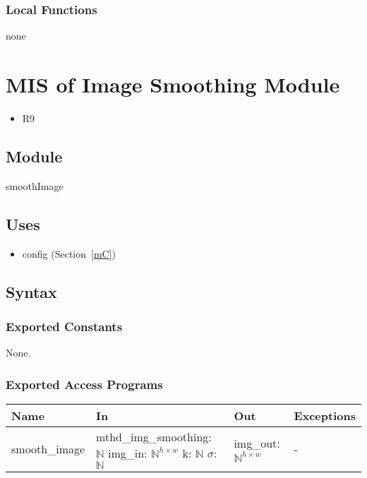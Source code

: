 \documentclass[12pt, titlepage]{article}
\begin{document}
\subsubsection{Local Functions}
none


\section{MIS of Image Smoothing Module} \label{mIS}
\begin{itemize}
  \item R9
\end{itemize}
\subsection{Module}
smoothImage

\subsection{Uses}
\begin{itemize}
  \item config (Section~\ref{mC})
\end{itemize}

\subsection{Syntax}
\subsubsection{Exported Constants}
None.
\subsubsection{Exported Access Programs}
\begin{center}
  \begin{tabular}{p{4cm} p{4.5cm} p{4cm} p{2cm}}
  \hline
  \textbf{Name} & \textbf{In} & \textbf{Out} & \textbf{Exceptions} \\
  \hline
  smooth\_image
  & mthd\_img\_smoothing: $\mathbb{N}$ \newline
  img\_in: $\mathbb{N}^{h \times w}$ \newline
  k: $\mathbb{N}$ \newline
  $\sigma$: $\mathbb{N}$
  & img\_out: $\mathbb{N}^{h \times w}$
  & - \\
  \hline
  \end{tabular}
  \end{center}
\end{document}
